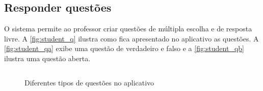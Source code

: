 \subsection{Responder questões}\label{subsecao:alunosrespondem}

O sistema permite ao professor criar questões de múltipla escolha e
de resposta livre. A \autoref{fig:student_q} ilustra como fica
apresentado no aplicativo as questões. A \autoref{fig:student_qa} exibe
uma questão de verdadeiro e falso e a \autoref{fig:student_qb} ilustra
uma questão aberta.

\begin{figure}[ht]
  \centering
  \caption{Diferentes tipos de questões no aplicativo}

  $\quad$

  \doautor
    \label{fig:student_q}
\end{figure}
